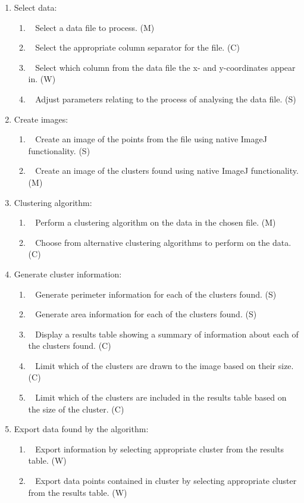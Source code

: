 \begin{enumerate}[label=\arabic*.]
	\item Select data:
		\begin{enumerate}[label*=\arabic*.]
			\item~\label{req:a} Select a data file to process. (M)
			\item~\label{req:b} Select the appropriate column separator for the
				file. (C)
			\item~\label{req:c} Select which column from the data file the x-
				and y-coordinates appear in. (W)
			\item~\label{req:d} Adjust parameters relating to the process of
				analysing the data file. (S)
		\end{enumerate}
	\item Create images:
		\begin{enumerate}[label*=\arabic*.]
			\item~\label{req:e} Create an image of the points from the file
				using native ImageJ functionality. (S)
			\item~\label{req:f} Create an image of the clusters found using
				native ImageJ functionality. (M)
		\end{enumerate}
	\item Clustering algorithm:
		\begin{enumerate}[label*=\arabic*.]
			\item~\label{req:g} Perform a clustering algorithm on the data in
				the chosen file. (M)
			\item~\label{req:ga} Choose from alternative clustering algorithms
				to perform on the data. (C)
		\end{enumerate}
	\item Generate cluster information:
		\begin{enumerate}[label*=\arabic*.]
			\item~\label{req:h} Generate perimeter information for each of the
				clusters found. (S)
			\item~\label{req:i} Generate area information for each of the
				clusters found. (S)
			\item~\label{req:j} Display a results table showing a summary of
				information about each of the clusters found. (C)
			\item~\label{req:k} Limit which of the clusters are drawn to the
				image based on their size. (C)
			\item~\label{req:l} Limit which of the clusters are included in the
				results table based on the size of the cluster. (C)
		\end{enumerate}
	\item Export data found by the algorithm:
		\begin{enumerate}[label*=\arabic*.]
			\item~\label{req:m} Export information by selecting appropriate
				cluster from the results table. (W)
			\item~\label{req:n} Export data points contained in cluster by
				selecting appropriate cluster from the results table. (W)
		\end{enumerate}
\end{enumerate}

